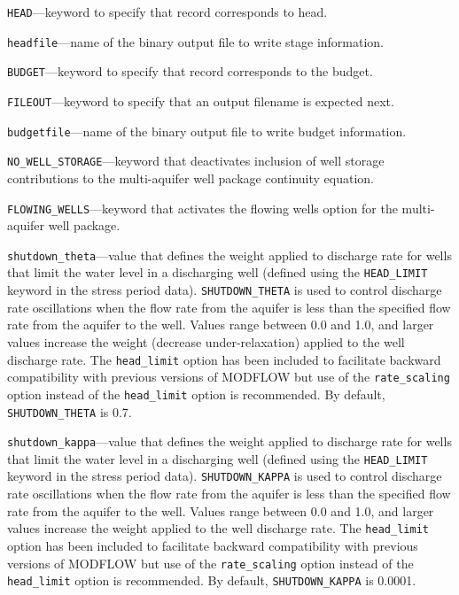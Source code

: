 \begin{description}
\item \texttt{HEAD}---keyword to specify that record corresponds to head.

\item \texttt{headfile}---name of the binary output file to write stage information.

\item \texttt{BUDGET}---keyword to specify that record corresponds to the budget.

\item \texttt{FILEOUT}---keyword to specify that an output filename is expected next.

\item \texttt{budgetfile}---name of the binary output file to write budget information.

\item \texttt{NO\_WELL\_STORAGE}---keyword that deactivates inclusion of well storage contributions to the multi-aquifer well package continuity equation.

\item \texttt{FLOWING\_WELLS}---keyword that activates the flowing wells option for the multi-aquifer well package.

\item \texttt{shutdown\_theta}---value that defines the weight applied to discharge rate for wells that limit the water level in a discharging well (defined using the \texttt{HEAD\_LIMIT} keyword in the stress period data). \texttt{SHUTDOWN\_THETA} is used to control discharge rate oscillations when the flow rate from the aquifer is less than the specified flow rate from the aquifer to the well. Values range between 0.0 and 1.0, and larger values increase the weight (decrease under-relaxation) applied to the well discharge rate. The \texttt{head\_limit} option has been included to facilitate backward compatibility with previous versions of MODFLOW but use of the \texttt{rate\_scaling} option instead of the \texttt{head\_limit} option is recommended. By default, \texttt{SHUTDOWN\_THETA} is 0.7.

\item \texttt{shutdown\_kappa}---value that defines the weight applied to discharge rate for wells that limit the water level in a discharging well (defined using the \texttt{HEAD\_LIMIT} keyword in the stress period data). \texttt{SHUTDOWN\_KAPPA} is used to control discharge rate oscillations when the flow rate from the aquifer is less than the specified flow rate from the aquifer to the well. Values range between 0.0 and 1.0, and larger values increase the weight applied to the well discharge rate. The \texttt{head\_limit} option has been included to facilitate backward compatibility with previous versions of MODFLOW but use of the \texttt{rate\_scaling} option instead of the \texttt{head\_limit} option is recommended. By default, \texttt{SHUTDOWN\_KAPPA} is 0.0001.


\end{description}
